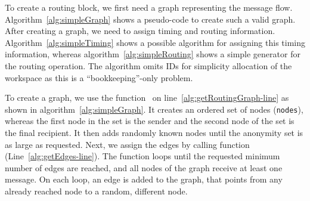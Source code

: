 To create a routing block, we first need a graph representing the message flow. Algorithm~\ref{alg:simpleGraph} shows a pseudo-code to create such a valid graph. After creating a graph, we need to assign timing and routing information. Algorithm~\ref{alg:simpleTiming} shows a possible algorithm for assigning this timing information, whereas algorithm~\ref{alg:simpleRouting} shows a simple generator for the routing operation. The algorithm omits IDs for simplicity allocation of the workspace as this is a ``bookkeeping''-only problem.

To create a graph, we use the function~ on line~\ref{alg:getRoutingGraph-line} as shown in algorithm~\ref{alg:simpleGraph}. It creates an ordered set of nodes (\texttt{nodes}), whereas the first node in the set is the sender and the second node of the set is the final recipient. It then adds randomly known nodes until the anonymity set is as large as requested. Next, we assign the edges by calling function~ (Line~\ref{alg:getEdges-line}). The function loops until the requested minimum number of edges are reached, and all nodes of the graph receive at least one message. On each loop, an edge is added to the graph, that points from any already reached node to a random, different node.

